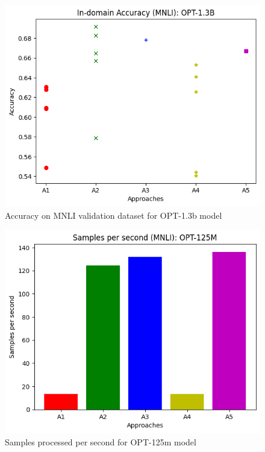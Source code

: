 \documentclass[10pt,twocolumn,letterpaper]{article}
\begin{document}
\begin{figure}[h!]
\begin{center}
\includegraphics[width=0.8\linewidth]{figures/opt-1_3b-accuracy.png}
\end{center}
\caption{Accuracy on MNLI validation dataset for OPT-1.3b model}
\end{figure}

\begin{figure}[h!]
\begin{center}
\includegraphics[width=0.8\linewidth]{figures/samples-opt125m.png}
\end{center}
\caption{Samples processed per second for OPT-125m model}
\end{figure}
\end{document}
